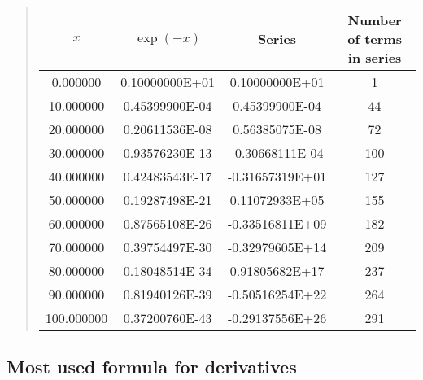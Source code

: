 \documentclass[%
twoside,                 %
final,                   %
10pt]{article}
\newenvironment{block_mdfboxadmon}[1][]{
\begin{block_mdfboxmdframed}[frametitle=#1]
}
{
\end{block_mdfboxmdframed}
}
\begin{document}
\begin{block_mdfboxadmon}


\begin{quote}
\begin{tabular}{cccc}
\hline
\multicolumn{1}{c}{ $x$ } & \multicolumn{1}{c}{ $\exp{(-x)}$ } & \multicolumn{1}{c}{ Series } & \multicolumn{1}{c}{ Number of terms in series } \\
\hline
0.000000                  & 0.10000000E+01            & 0.10000000E+01            & 1                         \\
10.000000                 & 0.45399900E-04            & 0.45399900E-04            & 44                        \\
20.000000                 & 0.20611536E-08            & 0.56385075E-08            & 72                        \\
30.000000                 & 0.93576230E-13            & -0.30668111E-04           & 100                       \\
40.000000                 & 0.42483543E-17            & -0.31657319E+01           & 127                       \\
50.000000                 & 0.19287498E-21            & 0.11072933E+05            & 155                       \\
60.000000                 & 0.87565108E-26            & -0.33516811E+09           & 182                       \\
70.000000                 & 0.39754497E-30            & -0.32979605E+14           & 209                       \\
80.000000                 & 0.18048514E-34            & 0.91805682E+17            & 237                       \\
90.000000                 & 0.81940126E-39            & -0.50516254E+22           & 264                       \\
100.000000                & 0.37200760E-43            & -0.29137556E+26           & 291                       \\
\hline
\end{tabular}
\end{quote}

\noindent
\end{block_mdfboxadmon}



\subsection{Most used formula for derivatives}
\end{document}

